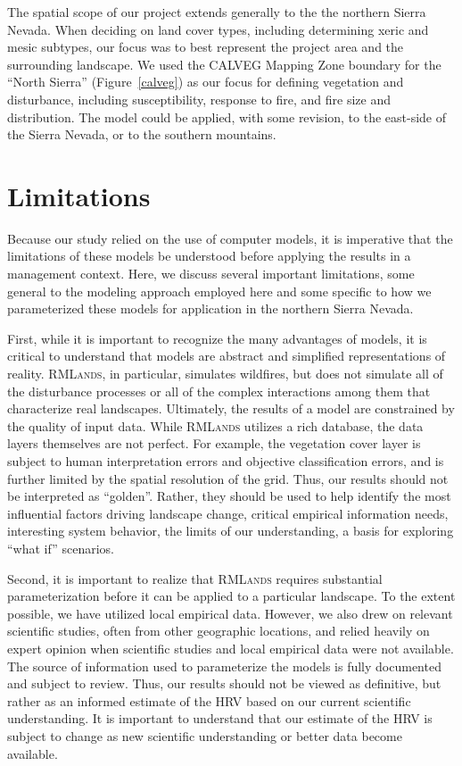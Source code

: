 The spatial scope of our project extends generally to the the northern Sierra Nevada. When deciding on land cover types, including determining xeric and mesic subtypes, our focus was to best represent the project area and the surrounding landscape. We used the CALVEG Mapping Zone boundary for the ``North Sierra'' (Figure~\ref{calveg}) as our focus for defining vegetation and disturbance, including susceptibility, response to fire, and fire size and distribution. The model could be applied, with some revision, to the east-side of the Sierra Nevada, or to the southern mountains.

\section{Limitations}

Because our study relied on the use of computer models, it is imperative that the limitations of these models be understood before applying the results in a management context. Here, we discuss several important limitations, some general to the modeling approach employed here and some specific to how we parameterized these models for application in the northern Sierra Nevada.

First, while it is important to recognize the many advantages of models, it is critical to understand that models are abstract and simplified representations of reality. \textsc{RMLands}, in particular, simulates wildfires, but does not simulate all of the disturbance processes or all of the complex interactions among them that characterize real landscapes. Ultimately, the results of a model are constrained by the quality of input data. While \textsc{RMLands} utilizes a rich database, the data layers themselves are not perfect. For example, the vegetation cover layer is subject to human interpretation errors and objective classification errors, and is further limited by the spatial resolution of the grid. Thus, our results should not be interpreted as ``golden''. Rather, they should be used to help identify the most influential factors driving landscape change, critical empirical information needs, interesting system behavior, the limits of our understanding, a basis for exploring “what if” scenarios.

Second, it is important to realize that \textsc{RMLands} requires substantial parameterization before it can be applied to a particular landscape. To the extent possible, we have utilized local empirical data. However, we also drew on relevant scientific studies, often from other geographic locations, and relied heavily on expert opinion when scientific studies and local empirical data were not available. The source of information used to parameterize the models is fully documented and subject to review. Thus, our results should not be viewed as definitive, but rather as an informed estimate of the HRV based on our current scientific understanding. It is important to understand that our estimate of the HRV is subject to change as new scientific understanding or better data become available.

